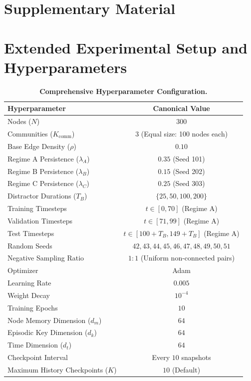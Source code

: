 \section*{Supplementary Material}
\appendix

\section{Extended Experimental Setup and Hyperparameters}
\label{app:hyperparameters}

\begin{table}[h]
\centering
\small
\caption{\textbf{Comprehensive Hyperparameter Configuration.}}
\label{tab:app_hyperparameters}
\begin{tabular}{lc}
\toprule
\textbf{Hyperparameter} & \textbf{Canonical Value} \\
\midrule
Nodes ($N$) & $300$ \\
Communities ($K_{\text{comm}}$) & $3$ (Equal size: 100 nodes each) \\
Base Edge Density ($\rho$) & $0.10$ \\
Regime A Persistence ($\lambda_A$) & $0.35$ (Seed 101) \\
Regime B Persistence ($\lambda_B$) & $0.15$ (Seed 202) \\
Regime C Persistence ($\lambda_C$) & $0.25$ (Seed 303) \\
Distractor Durations ($T_B$) & $\{25, 50, 100, 200\}$ \\
Training Timesteps & $t \in [0, 70]$ (Regime A) \\
Validation Timesteps & $t \in [71, 99]$ (Regime A) \\
Test Timesteps & $t \in [100+T_B, 149+T_B]$ (Regime A) \\
Random Seeds & $42, 43, 44, 45, 46, 47, 48, 49, 50, 51$ \\
Negative Sampling Ratio & $1:1$ (Uniform non-connected pairs) \\
Optimizer & Adam \\
Learning Rate & $0.005$ \\
Weight Decay & $10^{-4}$ \\
Training Epochs & $10$ \\
Node Memory Dimension ($d_m$) & $64$ \\
Episodic Key Dimension ($d_k$) & $64$ \\
Time Dimension ($d_t$) & $64$ \\
Checkpoint Interval & Every $10$ snapshots \\
Maximum History Checkpoints ($K$) & $10$ (Default) \\
\bottomrule
\end{tabular}
\end{table}

